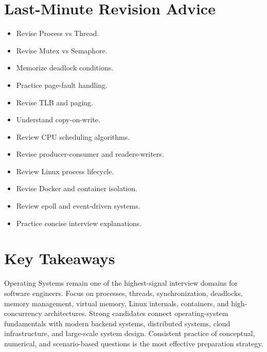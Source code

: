 \section{Last-Minute Revision Advice}

\begin{itemize}
\item Revise Process vs Thread.
\item Revise Mutex vs Semaphore.
\item Memorize deadlock conditions.
\item Practice page-fault handling.
\item Revise TLB and paging.
\item Understand copy-on-write.
\item Review CPU scheduling algorithms.
\item Revise producer-consumer and readers-writers.
\item Review Linux process lifecycle.
\item Revise Docker and container isolation.
\item Review epoll and event-driven systems.
\item Practice concise interview explanations.
\end{itemize}

\section{Key Takeaways}

\begin{keytakeaways}
Operating Systems remain one of the highest-signal interview domains for software engineers. Focus on processes, threads, synchronization, deadlocks, memory management, virtual memory, Linux internals, containers, and high-concurrency architectures. Strong candidates connect operating-system fundamentals with modern backend systems, distributed systems, cloud infrastructure, and large-scale system design. Consistent practice of conceptual, numerical, and scenario-based questions is the most effective preparation strategy.
\end{keytakeaways}
